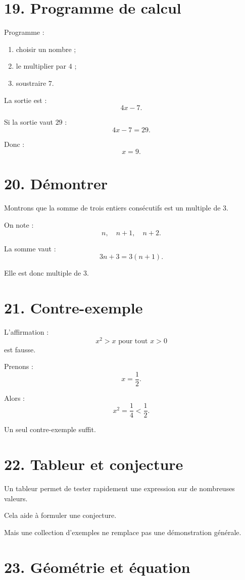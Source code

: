 \section{19. Programme de calcul}

Programme :
\begin{enumerate}
\item choisir un nombre ;
\item le multiplier par $4$ ;
\item soustraire $7$.
\end{enumerate}

La sortie est :
\[
4x-7.
\]

Si la sortie vaut $29$ :
\[
4x-7=29.
\]

Donc :
\[
x=9.
\]

\section{20. Démontrer}

Montrons que la somme de trois entiers consécutifs est un multiple de $3$.

On note :
\[
n,\quad n+1,\quad n+2.
\]

La somme vaut :
\[
3n+3=3(n+1).
\]

Elle est donc multiple de $3$.

\section{21. Contre-exemple}

L'affirmation :
\[
x^2>x\text{ pour tout }x>0
\]
est fausse.

Prenons :
\[
x=\dfrac12.
\]

Alors :
\[
x^2=\dfrac14<\dfrac12.
\]

Un seul contre-exemple suffit.

\section{22. Tableur et conjecture}

Un tableur permet de tester rapidement une expression sur de nombreuses valeurs.

Cela aide à formuler une conjecture.

Mais une collection d'exemples ne remplace pas une démonstration générale.

\section{23. Géométrie et équation}

